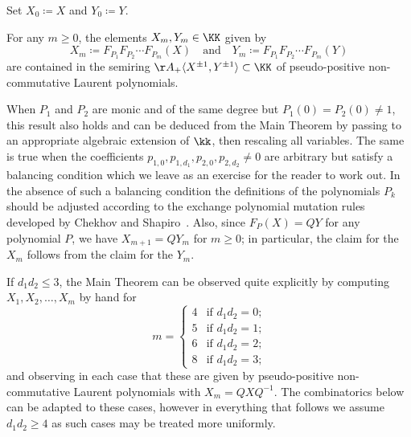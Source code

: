  Set $X_0\coloneqq X$ and $Y_0\coloneqq Y$.
 \begin{maintheorem}
 \label{th:main}
 For any $m\ge0$, the elements $ X_m, Y_m\in\KK$ given by
 \begin{equation}
 \label{eq:non-commutative initial cluster mutation}
 X_m\coloneqq F_{P_1}F_{P_2}\cdots F_{P_m}(X)\quad\text{and}\quad Y_m\coloneqq F_{P_1}F_{P_2}\cdots F_{P_m}(Y)
 \end{equation}
 are contained in the semiring $\AA_+\langle X^{\pm1},Y^{\pm1}\rangle\subset\KK$ of pseudo-positive non-commutative Laurent polynomials.
 \end{maintheorem}
 \begin{introremark}
 When $P_1$ and $P_2$ are monic and of the same degree but $P_1(0)=P_2(0)\ne1$, this result also holds and can be deduced from the Main Theorem by passing to an appropriate algebraic extension of $\kk$, then rescaling all variables. 
 The same is true when the coefficients $p_{1,0},p_{1,d_1},p_{2,0},p_{2,d_2}\ne0$ are arbitrary but satisfy a balancing condition which we leave as an exercise for the reader to work out. 
 In the absence of such a balancing condition the definitions of the polynomials $P_k$ should be adjusted according to the exchange polynomial mutation rules developed by Chekhov and Shapiro~\cite{chekhov-shapiro}.
 Also, since $F_P(X)=QY$ for any polynomial $P$, we have $X_{m+1}=QY_m$ for $m\ge0$; in particular, the claim for the $X_m$ follows from the claim for the $Y_m$.
 \end{introremark}
 \begin{introremark}
 If $d_1d_2\le3$, the Main Theorem can be observed quite explicitly by computing $X_1,X_2,\ldots,X_m$ by hand for 
 \[
 m=\begin{cases} 4 & \text{if $d_1d_2=0$;}\\ 5 & \text{if $d_1d_2=1$;}\\ 6 & \text{if $d_1d_2=2$;}\\ 8 & \text{if $d_1d_2=3$;}\end{cases}
 \]
 and observing in each case that these are given by pseudo-positive non-commutative Laurent polynomials with $X_m=QXQ^{-1}$.
 The combinatorics below can be adapted to these cases, however in everything that follows we assume $d_1d_2\ge4$ as such cases may be treated more uniformly.
 \end{introremark}

